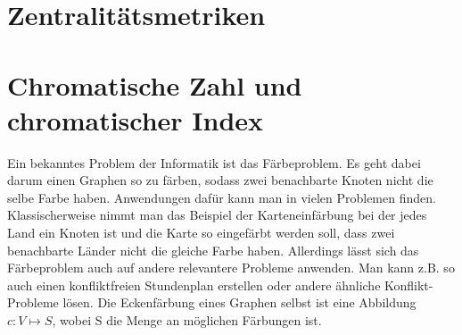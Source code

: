 \documentclass[a4paper,12pt,ngerman,chapterprefix=false,listof=totoc,bibliography=totoc]{scrreprt}
\begin{document}
\section{Zentralitätsmetriken}

\section{Chromatische Zahl und chromatischer Index}
{
Ein bekanntes Problem der Informatik ist das Färbeproblem. Es geht dabei darum einen Graphen so zu färben, sodass zwei benachbarte Knoten nicht die selbe Farbe haben. Anwendungen dafür kann man in vielen Problemen finden. Klassischerweise nimmt man das Beispiel der Karteneinfärbung bei der jedes Land ein Knoten ist und die Karte so eingefärbt werden soll, dass zwei benachbarte Länder nicht die gleiche Farbe haben. Allerdings lässt sich das Färbeproblem auch auf andere relevantere Probleme anwenden. Man kann z.B. so auch einen konfliktfreien Stundenplan erstellen oder andere ähnliche Konflikt-Probleme lösen. Die Eckenfärbung eines Graphen selbst ist eine Abbildung \(c: V\mapsto S\), wobei S die Menge an möglichen Färbungen ist. \cite{diestel_graphentheorie_2000,aigner_graphentheorie_2015} 
}
\end{document}
